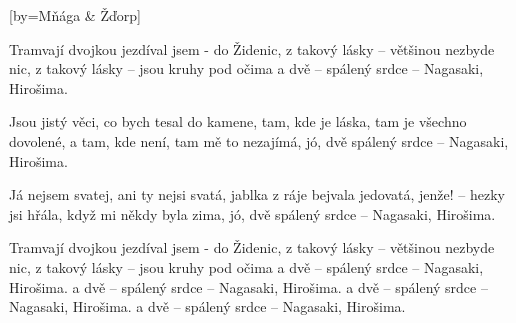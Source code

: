 [by={Mňága \& Žďorp}]

\beginchorus{}
Tramvají dvojkou jezdíval jsem - do Židenic,  
z takový lásky -- většinou nezbyde nic,
z takový lásky -- jsou kruhy pod očima
a dvě -- spálený srdce -- Nagasaki, Hirošima.  
\endchorus{}

\beginverse{}
Jsou jistý věci, co bych tesal do kamene,   
tam, kde je láska, tam je všechno dovolené,
a tam, kde není, tam mě to nezajímá,
jó, dvě spálený srdce -- Nagasaki, Hirošima.  
\endverse{}

\beginverse{}
Já nejsem svatej, ani ty nejsi svatá,   
jablka z ráje bejvala jedovatá,
jenže! -- hezky jsi hřála, když mi někdy byla zima,
jó, dvě spálený srdce -- Nagasaki, Hirošima.  
\endverse{}

\beginchorus{}
Tramvají dvojkou jezdíval jsem - do Židenic,  
z takový lásky -- většinou nezbyde nic,
z takový lásky -- jsou kruhy pod očima
a dvě -- spálený srdce -- Nagasaki, Hirošima.  
a dvě -- spálený srdce -- Nagasaki, Hirošima.  
a dvě -- spálený srdce -- Nagasaki, Hirošima.  
a dvě -- spálený srdce -- Nagasaki, Hirošima.  
\endchorus{}

\endsong{}
